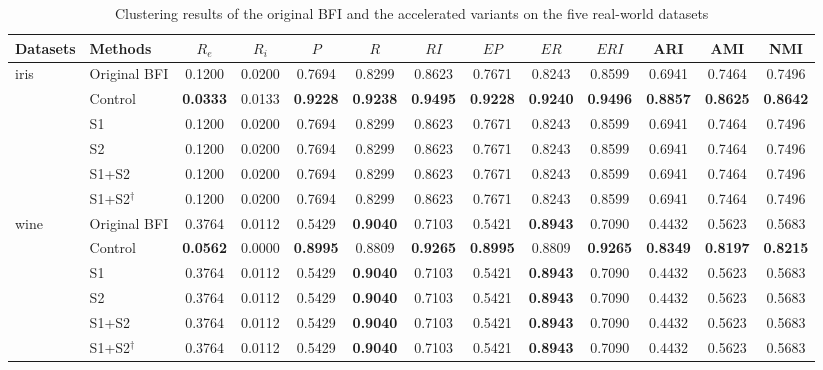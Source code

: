 \begin{table}[!t]
\centering
\caption{Clustering results of the original BFI and the accelerated variants on the five real-world datasets}
\label{tab:real}
\scriptsize
\setlength{\tabcolsep}{4.2pt}
\begin{tabular}{llccccccccccc}
\toprule
Datasets & Methods & $R_e$ & $R_i$ & $P$ & $R$ & $RI$ & $EP$ & $ER$ & $ERI$ & ARI & AMI & NMI \\
\midrule
\multirow{6}{*}{iris} & Original BFI & 0.1200 & 0.0200 & 0.7694 & 0.8299 & 0.8623 & 0.7671 & 0.8243 & 0.8599 & 0.6941 & 0.7464 & 0.7496 \\
 & Control & \textbf{0.0333} & 0.0133 & \textbf{0.9228} & \textbf{0.9238} & \textbf{0.9495} & \textbf{0.9228} & \textbf{0.9240} & \textbf{0.9496} & \textbf{0.8857} & \textbf{0.8625} & \textbf{0.8642} \\
 & S1 & 0.1200 & 0.0200 & 0.7694 & 0.8299 & 0.8623 & 0.7671 & 0.8243 & 0.8599 & 0.6941 & 0.7464 & 0.7496 \\
 & S2 & 0.1200 & 0.0200 & 0.7694 & 0.8299 & 0.8623 & 0.7671 & 0.8243 & 0.8599 & 0.6941 & 0.7464 & 0.7496 \\
 & S1+S2 & 0.1200 & 0.0200 & 0.7694 & 0.8299 & 0.8623 & 0.7671 & 0.8243 & 0.8599 & 0.6941 & 0.7464 & 0.7496 \\
 & S1+S2$^{\dagger}$ & 0.1200 & 0.0200 & 0.7694 & 0.8299 & 0.8623 & 0.7671 & 0.8243 & 0.8599 & 0.6941 & 0.7464 & 0.7496 \\
\midrule
\multirow{6}{*}{wine} & Original BFI & 0.3764 & 0.0112 & 0.5429 & \textbf{0.9040} & 0.7103 & 0.5421 & \textbf{0.8943} & 0.7090 & 0.4432 & 0.5623 & 0.5683 \\
 & Control & \textbf{0.0562} & 0.0000 & \textbf{0.8995} & 0.8809 & \textbf{0.9265} & \textbf{0.8995} & 0.8809 & \textbf{0.9265} & \textbf{0.8349} & \textbf{0.8197} & \textbf{0.8215} \\
 & S1 & 0.3764 & 0.0112 & 0.5429 & \textbf{0.9040} & 0.7103 & 0.5421 & \textbf{0.8943} & 0.7090 & 0.4432 & 0.5623 & 0.5683 \\
 & S2 & 0.3764 & 0.0112 & 0.5429 & \textbf{0.9040} & 0.7103 & 0.5421 & \textbf{0.8943} & 0.7090 & 0.4432 & 0.5623 & 0.5683 \\
 & S1+S2 & 0.3764 & 0.0112 & 0.5429 & \textbf{0.9040} & 0.7103 & 0.5421 & \textbf{0.8943} & 0.7090 & 0.4432 & 0.5623 & 0.5683 \\
 & S1+S2$^{\dagger}$ & 0.3764 & 0.0112 & 0.5429 & \textbf{0.9040} & 0.7103 & 0.5421 & \textbf{0.8943} & 0.7090 & 0.4432 & 0.5623 & 0.5683 \\

\end{tabular}
\end{table}
